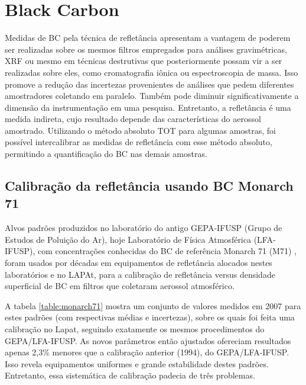 \section{Black Carbon}

Medidas de BC pela técnica de refletância apresentam a vantagem de poderem ser 
realizadas sobre os mesmos filtros empregados para análises gravimétricas, 
XRF ou mesmo em técnicas destrutivas que posteriormente possam vir a ser 
realizadas sobre eles, como cromatografia iônica ou espectroscopia de massa. 
Isso promove a redução das incertezas provenientes de análises que pedem 
diferentes amostradores coletando em paralelo. Também pode diminuir 
significativamente a dimensão da instrumentação em uma pesquisa. Entretanto, 
a refletância é uma medida indireta, cujo resultado depende das características 
do aerossol amostrado. Utilizando o método absoluto TOT para algumas amostras, 
foi possível intercalibrar as medidas de refletância com esse método absoluto, 
permitindo a quantificação do BC nas demais amostras.

\subsection{Calibração da refletância usando BC Monarch 71}

Alvos padrões produzidos no laboratório do antigo GEPA-IFUSP (Grupo de Estudos 
de Poluição do Ar), hoje Laboratório de Física Atmosférica (LFA-IFUSP), 
com concentrações conhecidas do BC de referência Monarch 71 (M71) 
\citep{clarke1986}, foram usados por décadas em equipamentos de refletância 
alocados nestes laboratórios e no LAPAt, para a calibração de refletância versus
densidade superficial de BC em filtros que coletaram aerossol atmosférico.

A tabela \ref{table:monarch71} mostra um conjunto de valores medidos em 2007 
para estes padrões (com respectivas médias e incertezas), sobre os quais foi 
feita uma calibração no Lapat, seguindo exatamente os mesmos procedimentos do 
GEPA/LFA-IFUSP. As novos parâmetros então ajustados ofereciam resultados 
apenas 2,3\% menores que a calibração anterior (1994), do GEPA/LFA-IFUSP. 
Isso revela equipamentos uniformes e grande estabilidade destes padrões. 
Entretanto, essa sistemática de calibração padecia de três problemas.


